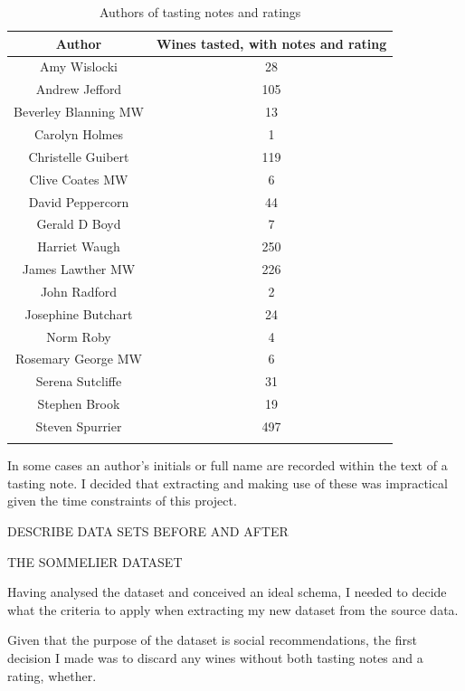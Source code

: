\begin{table}[ht]
\caption{Authors of tasting notes and ratings}
\centering
\begin{tabular}{c c}
\\\hline\hline
Author               & Wines tasted, with notes and rating
\\\hline
Amy Wislocki         &            28 \\
Andrew Jefford       &           105 \\
Beverley Blanning MW &            13 \\
Carolyn Holmes       &             1 \\
Christelle Guibert   &           119 \\
Clive Coates MW      &             6 \\
David Peppercorn     &            44 \\
Gerald D Boyd        &             7 \\
Harriet Waugh        &           250 \\
James Lawther MW     &           226 \\
John Radford         &             2 \\
Josephine Butchart   &            24 \\
Norm Roby            &             4 \\
Rosemary George MW   &             6 \\
Serena Sutcliffe     &            31 \\
Stephen Brook        &            19 \\
Steven Spurrier      &           497 \\
\\\hline
\end{tabular}
\label{table:authors}
\end{table}

In some cases an author's initials or full name are recorded within the text of a tasting note. I decided that extracting and making use of these was impractical given the time constraints of this project.

DESCRIBE DATA SETS BEFORE AND AFTER

THE SOMMELIER DATASET

Having analysed the dataset and conceived an ideal schema, I needed to decide what the criteria to apply when extracting my new dataset from the source data.

Given that the purpose of the dataset is social recommendations, the first decision I made was to discard any wines without both tasting notes and a rating, whether.
